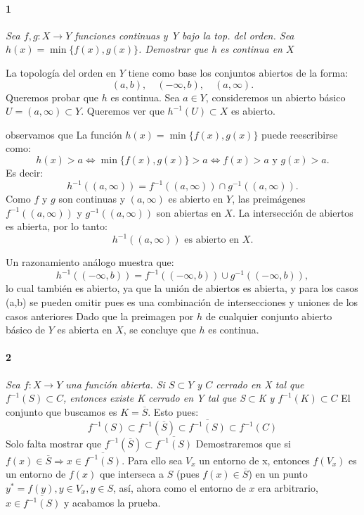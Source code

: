 \documentclass[12pt]{article}
\author{Alumnos: \\Arturo Rodriguez Contreras - 2132880 \\
Jonathan Raymundo Torres Cardenas - 1949731\\
Praxedis Jimenes Ruvalcaba \\
Erick Román Montemayor Treviño - 1957959 \\
Alexis Noe Mora Leyva - 1956093\\
Everardo Flores Rivera - 2127301}
\begin{document}
\maketitle

\paragraph{1}
\textit{Sea $f,g:X \to Y$ funciones continuas y Y bajo la top. del orden. Sea $h(x)=\min{\{f(x),g(x)\}}$. Demostrar que h es continua en $X$}

La topología del orden en \( Y \) tiene como base los conjuntos abiertos de la forma:
\[
(a, b),\quad (-\infty, b),\quad (a, \infty).
\]
Queremos probar que \( h \) es continua.  
Sea \( a \in Y \), consideremos un abierto básico \( U = (a, \infty) \subset Y \).  
Queremos ver que \( h^{-1}(U) \subset X \) es abierto.

observamos que
La función \( h(x) = \min\{f(x), g(x)\} \) puede reescribirse como:
\[
h(x) > a \iff \min\{f(x), g(x)\} > a \iff f(x) > a \text{ y } g(x) > a.
\]
Es decir:
\[
h^{-1}((a, \infty)) = f^{-1}((a, \infty)) \cap g^{-1}((a, \infty)).
\]
Como \( f \) y \( g \) son continuas y \( (a, \infty) \) es abierto en \( Y \), las preimágenes \( f^{-1}((a, \infty)) \) y \( g^{-1}((a, \infty)) \) son abiertas en \( X \).  
La intersección de abiertos es abierta, por lo tanto:
\[
h^{-1}((a, \infty)) \text{ es abierto en } X.
\]

Un razonamiento análogo muestra que:
\[
h^{-1}((-\infty, b)) = f^{-1}((-\infty, b)) \cup g^{-1}((-\infty, b)),
\]
lo cual también es abierto, ya que la unión de abiertos es abierta, y para los casos  (a,b) se pueden omitir pues es una combinación de intersecciones y uniones de los casos anteriores    
Dado que la preimagen por \( h \) de cualquier conjunto abierto básico de \( Y \) es abierta en \( X \), se concluye que \( h \) es continua.

\paragraph{2}
\textit{Sea $f:X\rightarrow Y$ una función abierta. Si $S \subset Y$ y $C$ cerrado en X tal que $f^{-1}(S)\subset C$, entonces existe K cerrado en Y tal que S$\subset$K y $f^{-1}(K)\subset C$}
El conjunto que buscamos es $K=\overline{S}$. Esto pues:
\begin{equation}
    f^{-1}(S) \subset f^{-1}(\overline{S}) \subset \overline{f^{-1}(S)} \subset f^{-1}(C)
\end{equation}
Solo falta mostrar que $f^{-1}(\overline{S}) \subset \overline{f^{-1}(S)}$
Demostraremos que si $f(x) \in \overline{S} \Rightarrow x \in \overline{f^{-1}(S)}$. Para ello sea $V_{x}$ un entorno de x, entonces $f(V_{x})$ es un entorno de $f(x)$
que interseca a $S$ (pues $f(x) \in \overline{S}$) en un punto $y^{*} = f(y), y \in V_{x}, y \in S$, así, ahora como el entorno de $x$ era arbitrario, $x \in \overline{f^{-1}(S)}$ y acabamos la prueba.
\end{document}

